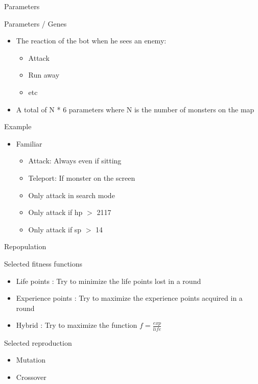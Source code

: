 \begin{frame}{Parameters}

  \begin{block}{Parameters / Genes}
    \begin{itemize}
    \item The reaction of the bot when he sees an enemy:
      \begin{itemize}
      \item Attack
      \item Run away
      \item etc
      \end{itemize}
    \item A total of N * 6 parameters where N is the number of monsters on the map
    \end{itemize}
  \end{block}

  \begin{block}{Example}
    \begin{itemize}
    \item Familiar
      \begin{itemize}
      \item Attack: Always even if sitting
      \item Teleport: If monster on the screen
      \item Only attack in search mode
      \item Only attack if hp $>$ 2117
      \item Only attack if sp $>$ 14
      \end{itemize}
    \end{itemize}
  \end{block}

\end{frame}

\begin{frame}{Repopulation}
  \begin{block}{Selected fitness functions}
    \begin{itemize}
    \item Life points : Try to minimize the life points lost in a round
    \item Experience points : Try to maximize the experience points acquired in a round
    \item Hybrid : Try to maximize the function $f = \frac{exp}{life} $
    \end{itemize}
  \end{block}

  \begin{block}{Selected reproduction}
    \begin{itemize}
    \item Mutation
    \item Crossover
    \end{itemize}
  \end{block}
\end{frame}

